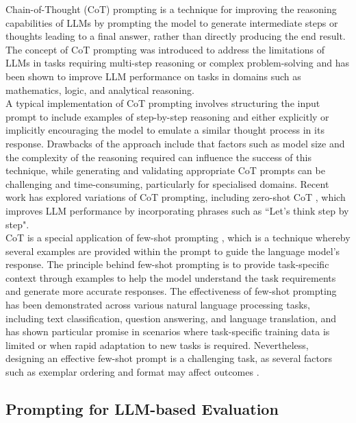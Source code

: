 Chain-of-Thought (CoT) prompting \cite{wei2022chain} is a technique for improving the reasoning capabilities of LLMs by prompting the model to generate intermediate steps or thoughts leading to a final answer, rather than directly producing the end result. The concept of CoT prompting was introduced to address the limitations of LLMs in tasks requiring multi-step reasoning or complex problem-solving and has been shown to improve LLM performance on tasks in domains such as mathematics, logic, and analytical reasoning. \\

A typical implementation of CoT prompting involves structuring the input prompt to include examples of step-by-step reasoning and either explicitly or implicitly encouraging the model to emulate a similar thought process in its response. Drawbacks of the approach include that factors such as model size and the complexity of the reasoning required can influence the success of this technique, while generating and validating appropriate CoT prompts can be challenging and time-consuming, particularly for specialised domains. Recent work has explored variations of CoT prompting, including zero-shot CoT \cite{kojima2023largelanguagemodelszeroshot}, which improves LLM performance by incorporating phrases such as ``Let’s think step by step".\\


CoT is a special application of few-shot prompting \cite{brown2020language}, which is a technique whereby several examples are provided within the prompt to guide the language model's response. The principle behind few-shot prompting is to provide task-specific context through examples to help the model understand the task requirements and generate more accurate responses. The effectiveness of few-shot prompting has been demonstrated across various natural language processing tasks, including text classification, question answering, and language translation, and has shown particular promise in scenarios where task-specific training data is limited or when rapid adaptation to new tasks is required. Nevertheless, designing an effective few-shot prompt is a challenging task, as several factors such as exemplar ordering and format may affect outcomes \cite{schulhoff2024promptreportsystematicsurvey}.



\subsection{Prompting for LLM-based Evaluation}


